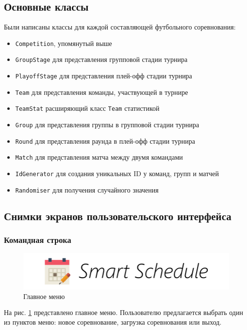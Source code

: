 \subsection{Основные классы}
Были написаны классы для каждой составляющей футбольного соревнования:
\begin{itemize}
\item \verb+Competition+, упомянутый выше
\item \verb+GroupStage+ для представления групповой стадии турнира
\item \verb+PlayoffStage+ для представления плей-офф стадии турнира
\item \verb+Team+ для представления команды, участвующей в турнире
\item \verb+TeamStat+ расширяющий класс \verb+Team+ статистикой
\item \verb+Group+ для представления группы в групповой стадии турнира
\item \verb+Round+ для представления раунда в плей-офф стадии турнира
\item \verb+Match+ для представления матча между двумя командами
\item \verb+IdGenerator+ для создания уникальных ID у команд, групп и матчей
\item \verb+Randomiser+ для получения случайного значения
\end{itemize}

\subsection{Снимки экранов пользовательского интерфейса}
\subsubsection{Командная строка}

\begin{figure}[H]
	\begin{center}
		\includegraphics[scale=0.8]{pics/logo}
		\caption{Главное меню} 
		\label{pic:cli_main_menu} %
	\end{center}
\end{figure}
На рис. \ref{pic:cli_main_menu} представлено главное меню. Пользователю предлагается выбрать один из пунктов меню: новое соревнование, загрузка соревнования или выход.

